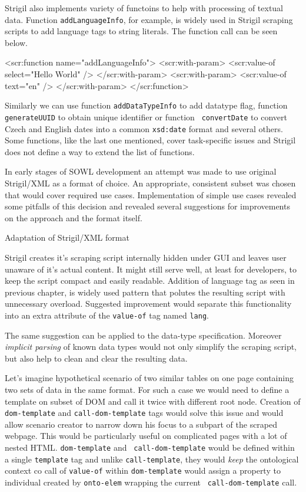 Strigil also implements variety of functoins to help with processing of textual
data. Function {\tt addLanguageInfo}, for example, is widely used in Strigil
scraping scripts to add language tags to string literals. The function call can
be seen below. 

\begtt
<scr:function name="addLanguageInfo">
  <scr:with-param>
    <scr:value-of select="Hello World" />
  </scr:with-param>
  <scr:with-param>
    <scr:value-of text="en" />
  </scr:with-param>
</scr:function>
\endtt

Similarly we can use function {\tt addDataTypeInfo} to add datatype flag,
function {\tt generateUUID} to obtain unique identifier or function {\tt
convertDate} to convert Czech and English dates into a common {\tt xsd:date}
format and several others. Some functions, like the last one mentioned, cover
task-specific issues and Strigil does not define a way to extend the list of
functions. 

In early stages of SOWL development an attempt was made to use original
Strigil/XML as a format of choice. An appropriate, consistent subset was chosen
that would cover required use cases. Implementation of simple use cases
revealed some pitfalls of this decision and revealed several suggestions for
improvements on the approach and the format itself. 


\secc Adaptation of Strigil/XML format

Strigil creates it's scraping script internally hidden under GUI and leaves
user unaware of it's actual content. It might still serve well, at least for
developers, to keep the script compact and easily readable. Addition of
language tag as seen in previous chapter, is widely used pattern that polutes
the resulting script with unnecessary overload. Suggested improvement would
separate this functionality into an extra attribute of the {\tt value-of} tag
named {\tt lang}.

The same suggestion can be applied to the data-type specification. Moreover
{\em implicit parsing} of known data types would not only simplify the scraping
script, but also help to clean and clear the resulting data. 

Let's imagine hypothetical scenario of two similar tables on one page
containing two sets of data in the same format. For such a case we would need
to define a template on subset of DOM and call it twice with different root
node. Creation of {\tt dom-template} and {\tt call-dom-template} tags would
solve this issue and would allow scenario creator to narrow down his focus to a
subpart of the scraped webpage. This would be particularly useful on
complicated pages with a lot of nested HTML. {\tt dom-template} and {\tt
call-dom-template} would be defined within a single {\tt template} tag and
unlike {\tt call-template}, they would {\em keep} the ontological context co
call of {\tt value-of} within {\tt dom-template} would assign a property to
individual created by {\tt onto-elem} wrapping the current {\tt
call-dom-template} call. 

